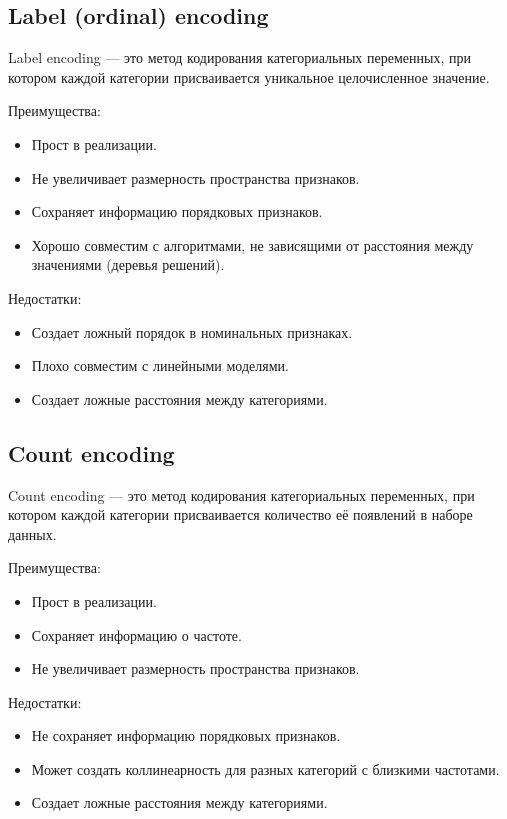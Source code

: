 \subsection*{Label (ordinal) encoding}

Label encoding — это метод кодирования категориальных переменных, при котором каждой категории присваивается уникальное целочисленное значение.

Преимущества:
\begin{itemize}
    \item Прост в реализации.
    \item Не увеличивает размерность пространства признаков.
    \item Сохраняет информацию порядковых признаков.
    \item Хорошо совместим с алгоритмами, не зависящими от расстояния между значениями (деревья решений).
\end{itemize}

Недостатки:
\begin{itemize}
    \item Создает ложный порядок в номинальных признаках.
    \item Плохо совместим с линейными моделями.
    \item Создает ложные расстояния между категориями.
\end{itemize}

\subsection*{Count encoding}

Count encoding — это метод кодирования категориальных переменных, при котором каждой категории присваивается количество её появлений в наборе данных.

Преимущества:
\begin{itemize}
    \item Прост в реализации.
    \item Сохраняет информацию о частоте.
    \item Не увеличивает размерность пространства признаков.
\end{itemize}

Недостатки:
\begin{itemize}
    \item Не сохраняет информацию порядковых признаков.
    \item Может создать коллинеарность для разных категорий с близкими частотами.
    \item Создает ложные расстояния между категориями.
\end{itemize}


